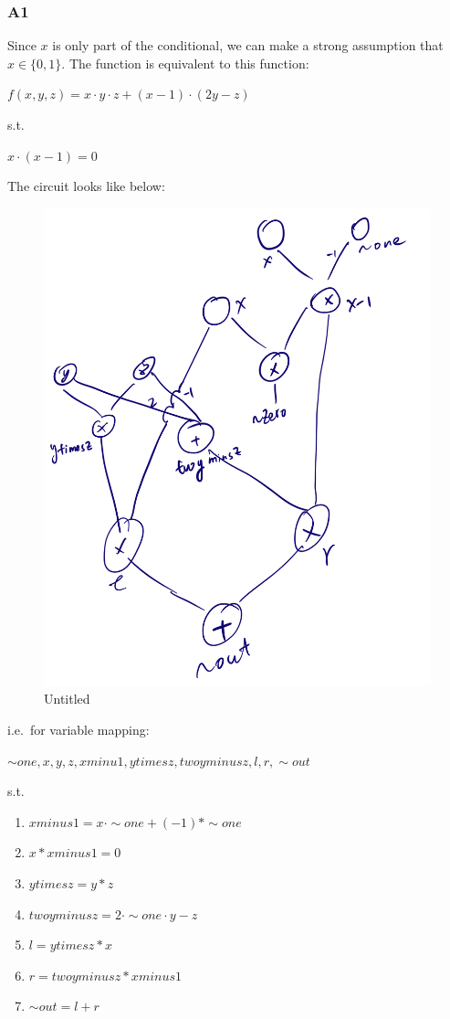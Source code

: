 \documentclass[11pt]{article}
\begin{document}
\subsubsection{A1}
\label{a1}
Since \(x\) is only part of the conditional, we can make a strong assumption that \(x \in \{0,1\}\). The function is equivalent to this function:

\(f(x,y,z)=x \cdot y \cdot z + (x-1)\cdot(2 y- z)\)

s.t.

\(x \cdot (x-1) = 0\)

The circuit looks like below:

\begin{figure}[htbp]
\centering
\includegraphics[width=.9\linewidth]{./img/1.png}
\caption{Untitled}
\end{figure}

i.e. for variable mapping:

\(\sim{one},x,y,z,xminu1,ytimesz,twoyminusz,l,r,\sim{out}\)

s.t.

\begin{enumerate}
\item \(xminus1 = x \cdot \sim{one} + (-1) * \sim{one}\)
\item \(x * xminus1=0\)
\item \(ytimesz = y * z\)
\item \(twoyminusz = 2 \cdot \sim{one} \cdot y - z\)
\item \(l = ytimesz * x\)
\item \(r = twoyminusz * xminus1\)
\item \(\sim{out} = l + r\)
\end{enumerate}
\end{document}
